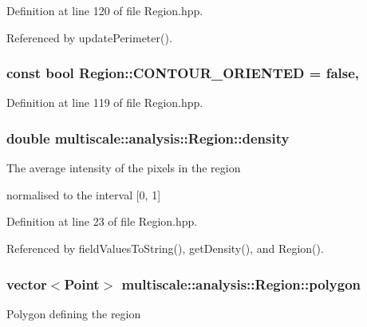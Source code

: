 Definition at line 120 of file Region.\-hpp.



Referenced by update\-Perimeter().

\hypertarget{classmultiscale_1_1analysis_1_1Region_a875a0f14dacf6904cabfa1f31020e6e2}{
\subsubsection[{C\-O\-N\-T\-O\-U\-R\-\_\-\-O\-R\-I\-E\-N\-T\-E\-D}]{\setlength{\rightskip}{0pt plus 5cm}const bool Region\-::\-C\-O\-N\-T\-O\-U\-R\-\_\-\-O\-R\-I\-E\-N\-T\-E\-D = false\hspace{0.3cm}{\ttfamily [static]}, {\ttfamily [private]}}}\label{classmultiscale_1_1analysis_1_1Region_a875a0f14dacf6904cabfa1f31020e6e2}


Definition at line 119 of file Region.\-hpp.

\hypertarget{classmultiscale_1_1analysis_1_1Region_af4eb62fddbe850271dfe15bb240b13bb}{
\subsubsection[{density}]{\setlength{\rightskip}{0pt plus 5cm}double multiscale\-::analysis\-::\-Region\-::density\hspace{0.3cm}{\ttfamily [private]}}}\label{classmultiscale_1_1analysis_1_1Region_af4eb62fddbe850271dfe15bb240b13bb}
\begin{DoxyVerb}             The average intensity of the pixels in the region
\end{DoxyVerb}
 normalised to the interval \mbox{[}0, 1\mbox{]} 

Definition at line 23 of file Region.\-hpp.



Referenced by field\-Values\-To\-String(), get\-Density(), and Region().

\hypertarget{classmultiscale_1_1analysis_1_1Region_a40d1b47f30bb09c6a47521a968163b6d}{
\subsubsection[{polygon}]{\setlength{\rightskip}{0pt plus 5cm}vector$<$Point$>$ multiscale\-::analysis\-::\-Region\-::polygon\hspace{0.3cm}{\ttfamily [private]}}}\label{classmultiscale_1_1analysis_1_1Region_a40d1b47f30bb09c6a47521a968163b6d}
Polygon defining the region 

